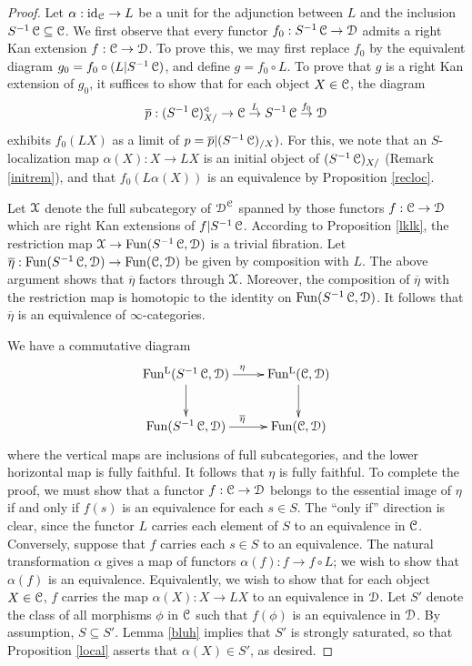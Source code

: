 \begin{proof}
Let $\alpha: \operatorname{id}_{\operatorname{\mathcal{C}}} \rightarrow L$ be a unit for the adjunction between $L$ and
the inclusion $S^{-1} \operatorname{\mathcal{C}} \subseteq \operatorname{\mathcal{C}}$.
We first observe that every functor $f_0: S^{-1} \operatorname{\mathcal{C}} \rightarrow \operatorname{\mathcal{D}}$ admits a right
Kan extension $f: \operatorname{\mathcal{C}} \rightarrow \operatorname{\mathcal{D}}$. To prove this, we may first replace $f_0$ by
the equivalent diagram $g_0 = f_0 \circ (L| S^{-1} \operatorname{\mathcal{C}})$, and define $g= f_0 \circ L$. To prove
that $g$ is a right Kan extension of $g_0$, it suffices to show that for each
object $X \in \operatorname{\mathcal{C}}$, the diagram
$$ \overline{p}: (S^{-1} \operatorname{\mathcal{C}})_{X/}^{\triangleleft} \rightarrow \operatorname{\mathcal{C}} \stackrel{L}{\rightarrow} 
S^{-1} \operatorname{\mathcal{C}} \stackrel{f_0}{\rightarrow} \operatorname{\mathcal{D}}$$
exhibits $f_0(LX)$ as a limit of $p = \overline{p} | (S^{-1} \operatorname{\mathcal{C}})_{/X})$. For this, we note
that an $S$-localization map $\alpha(X): X \rightarrow LX$ is an initial object of $(S^{-1} \operatorname{\mathcal{C}})_{X/}$ (Remark \ref{initrem}), and that $f_0( L \alpha(X))$ is an equivalence by Proposition \ref{recloc}.

Let $\operatorname{\mathcal{X}}$ denote the full subcategory of $\operatorname{\mathcal{D}}^{\operatorname{\mathcal{C}}}$ spanned by those functors
$f: \operatorname{\mathcal{C}} \rightarrow \operatorname{\mathcal{D}}$ which are right Kan extensions of $f| S^{-1} \operatorname{\mathcal{C}}$. According to 
Proposition \ref{lklk}, the restriction map $\operatorname{\mathcal{X}} \rightarrow \operatorname{Fun}(S^{-1} \operatorname{\mathcal{C}},\operatorname{\mathcal{D}})$ is a
trivial fibration. Let $\overline{\eta}: \operatorname{Fun}(S^{-1} \operatorname{\mathcal{C}}, \operatorname{\mathcal{D}}) \rightarrow \operatorname{Fun}(\operatorname{\mathcal{C}}, \operatorname{\mathcal{D}})$ be given
by composition with $L$. The above argument shows that $\overline{\eta}$ factors through $\operatorname{\mathcal{X}}$.
Moreover, the composition of $\overline{\eta}$ with the restriction map is homotopic to the identity on $\operatorname{Fun}(S^{-1} \operatorname{\mathcal{C}}, \operatorname{\mathcal{D}})$. It follows that $\overline{\eta}$ is an equivalence of $\infty$-categories.

We have a commutative diagram
$$ \xymatrix{ \LFun(S^{-1} \calC, \calD) \ar[r]^{\eta} \ar[d] & \LFun(\calC, \calD) \ar[d] \\
\Fun(S^{-1} \calC,\calD) \ar[r]^{\overline{\eta}} & \Fun(\calC, \calD) }$$
where the vertical maps are inclusions of full subcategories, and the lower horizontal map is fully faithful. It follows that $\eta$ is fully faithful. To complete the proof, we must show that a functor
$f: \operatorname{\mathcal{C}} \rightarrow \operatorname{\mathcal{D}}$ belongs to the essential image of $\eta$ if and only if
$f(s)$ is an equivalence for each $s \in S$. The ``only if'' direction is clear, since
the functor $L$ carries each element of $S$ to an equivalence in $\operatorname{\mathcal{C}}$. Conversely, suppose that
$f$ carries each $s \in S$ to an equivalence. The natural transformation $\alpha$
gives a map of functors $\alpha(f): f \rightarrow f \circ L$; we wish to show that $\alpha(f)$ is an equivalence. Equivalently, we wish to show that for each object $X \in \operatorname{\mathcal{C}}$, $f$ carries
the map $\alpha(X): X \rightarrow LX$ to an equivalence in $\operatorname{\mathcal{D}}$. Let $S'$ denote the
class of all morphisms $\phi$ in $\operatorname{\mathcal{C}}$ such that $f(\phi)$ is an equivalence in $\operatorname{\mathcal{D}}$.
By assumption, $S \subseteq S'$. Lemma \ref{bluh} implies that $S'$ is strongly saturated, so
that Proposition \ref{local} asserts that $\alpha(X) \in S'$, as desired.
\end{proof}

